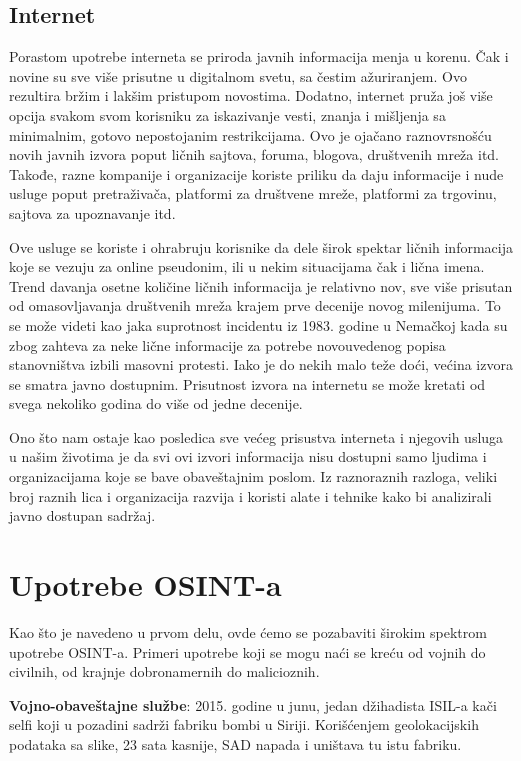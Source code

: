 \documentclass[fleqn, 12pt]{article}
\begin{document}
\subsection{Internet}
Porastom upotrebe interneta se priroda javnih informacija menja u korenu. Čak i novine su sve više prisutne u digitalnom svetu, sa čestim ažuriranjem. Ovo rezultira bržim i lakšim pristupom novostima. Dodatno, internet pruža još više opcija svakom svom korisniku za iskazivanje vesti, znanja i mišljenja sa minimalnim, gotovo nepostojanim restrikcijama. Ovo je ojačano raznovrsnošću novih javnih izvora poput ličnih sajtova, foruma, blogova, društvenih mreža itd. Takođe, razne kompanije i organizacije koriste priliku da daju informacije i nude usluge poput pretraživača, platformi za društvene mreže, platformi za trgovinu, sajtova za upoznavanje itd.\newline

Ove usluge se koriste i ohrabruju korisnike da dele širok spektar ličnih informacija koje se vezuju za online pseudonim, ili u nekim situacijama čak i lična imena. Trend davanja osetne količine ličnih informacija je relativno nov, sve više prisutan od omasovljavanja društvenih mreža krajem prve decenije novog milenijuma.  To se može videti kao jaka suprotnost incidentu iz 1983. godine u Nemačkoj kada su zbog zahteva za neke lične informacije za potrebe novouvedenog popisa stanovništva izbili masovni protesti.
Iako je do nekih malo teže doći, većina izvora se smatra javno dostupnim. Prisutnost izvora na internetu se može kretati od svega nekoliko godina do više od jedne decenije.\newline

Ono što nam ostaje kao posledica sve većeg prisustva interneta i njegovih usluga u našim životima je da svi ovi izvori informacija nisu dostupni samo ljudima i organizacijama koje se bave obaveštajnim poslom. Iz raznoraznih razloga, veliki broj raznih lica i organizacija razvija i koristi alate i tehnike kako bi analizirali javno dostupan sadržaj.
\newpage
\section{Upotrebe OSINT-a}
Kao što je navedeno u prvom delu, ovde ćemo se pozabaviti širokim spektrom upotrebe OSINT-a. Primeri upotrebe koji se mogu naći se kreću od vojnih do civilnih, od krajnje dobronamernih do malicioznih.\newline

\textbf{Vojno-obaveštajne službe}: 2015. godine u junu, jedan džihadista ISIL-a kači selfi koji u pozadini sadrži fabriku bombi u Siriji. Korišćenjem geolokacijskih podataka sa slike, 23 sata kasnije, SAD napada i uništava tu istu fabriku.\newline
\end{document}
